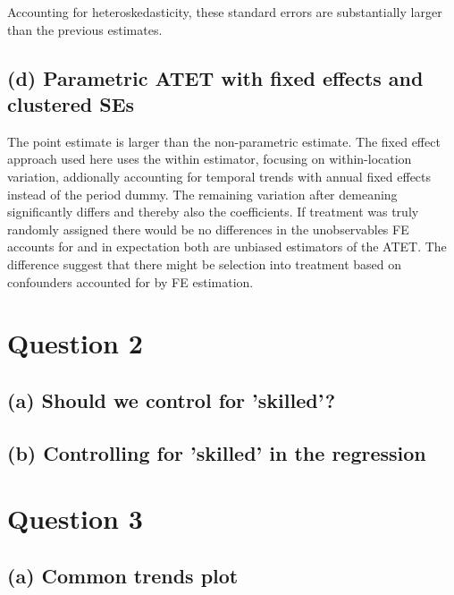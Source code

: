 \documentclass{scrartcl}
\begin{document}
Accounting for heteroskedasticity, these standard errors are substantially larger than the previous estimates.

\subsection*{(d) Parametric ATET with fixed effects and clustered SEs}

The point estimate is larger than the non-parametric estimate. The fixed effect approach used here uses the within estimator, focusing on within-location variation, addionally accounting for temporal trends with annual fixed effects instead of the period dummy. The remaining variation after demeaning significantly differs and thereby also the coefficients. If treatment was truly randomly assigned there would be no differences in the unobservables FE accounts for and in expectation both are unbiased estimators of the ATET. The difference suggest that there might be selection into treatment based on confounders accounted for by FE estimation.

\section*{Question 2}

\subsection*{(a) Should we control for 'skilled'?}


\subsection*{(b) Controlling for 'skilled' in the regression}


\section*{Question 3}

\subsection*{(a) Common trends plot}
\end{document}

